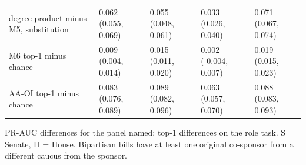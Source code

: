 \begin{table}[tbp]
{\begin{tabular}{lllll}
degree product minus M5, substitution & 0.062 (0.055, 0.069) & 0.055 (0.048, 0.061) & 0.033 (0.026, 0.040) & 0.071 (0.067, 0.074) \\
M6 top-1 minus chance & 0.009 (0.004, 0.014) & 0.015 (0.011, 0.020) & 0.002 (-0.004, 0.007) & 0.019 (0.015, 0.023) \\
AA-OI top-1 minus chance & 0.083 (0.076, 0.089) & 0.089 (0.082, 0.096) & 0.063 (0.057, 0.070) & 0.088 (0.083, 0.093) \\
\bottomrule
\end{tabular}
}
\par\vspace{2pt}\footnotesize PR-AUC differences for the panel named; top-1 differences on the role task. S = Senate, H = House. Bipartisan bills have at least one original co-sponsor from a different caucus from the sponsor.
\end{table}